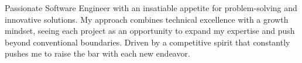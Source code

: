 

\begin{cvparagraph}

Passionate Software Engineer with an insatiable appetite for problem-solving and innovative solutions. My approach combines technical excellence with a growth mindset, seeing each project as an opportunity to expand my expertise and push beyond conventional boundaries. Driven by a competitive spirit that constantly pushes me to raise the bar with each new endeavor.
\end{cvparagraph}
